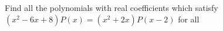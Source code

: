 Find all the polynomials with real coefficients which satisfy $ (x^2-6x+8)P(x)=(x^2+2x)P(x-2)$ for all 